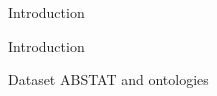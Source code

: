 \documentclass{beamer}
\begin{document}
\begin{frame}{Introduction}
\end{frame}

\begin{frame}{Introduction}
\end{frame}

\begin{frame}{Dataset ABSTAT and ontologies}
\end{frame}



\end{document}
